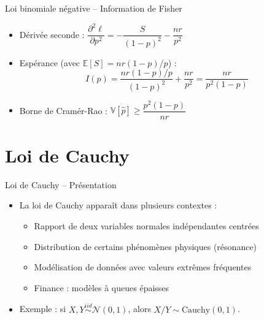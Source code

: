 \documentclass[11pt,aspectratio=169]{beamer}
\begin{document}
\begin{frame}{Loi binomiale négative -- Information de Fisher}

\begin{itemize}

\item Dérivée seconde : $\dfrac{\partial^2 \ell}{\partial p^2} = -\dfrac{S}{(1-p)^2} - \dfrac{nr}{p^2}$\newline

\item Espérance (avec $\mathbb{E}[S] = nr(1-p)/p$) :
  \[
  I(p) = \frac{nr(1-p)/p}{(1-p)^2} + \frac{nr}{p^2} = \boxed{\frac{nr}{p^2(1-p)}}
  \]

\item Borne de Cramér-Rao : $\mathbb{V}[\hat{p}] \geq \dfrac{p^2(1-p)}{nr}$ \checkmark

\end{itemize}

\end{frame}

\section{Loi de Cauchy}

\begin{frame}{Loi de Cauchy -- Présentation}

\begin{itemize}

\item La loi de Cauchy apparaît dans plusieurs contextes :\newline
  \begin{itemize}
    \item Rapport de deux variables normales indépendantes centrées\newline
    \item Distribution de certains phénomènes physiques (résonance)\newline
    \item Modélisation de données avec valeurs extrêmes fréquentes\newline
    \item Finance : modèles à queues épaisses\newline
  \end{itemize}

\item Exemple : si $X, Y \overset{iid}{\sim} \mathcal{N}(0,1)$, alors $X/Y \sim \text{Cauchy}(0,1)$.

\end{itemize}

\end{frame}
\end{document}
